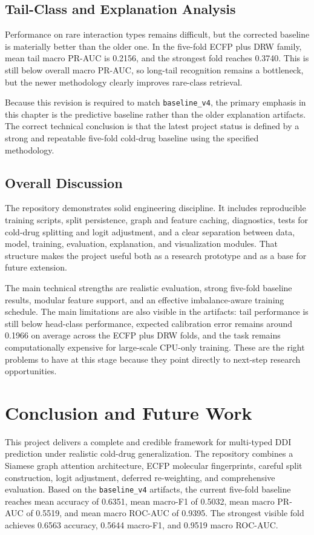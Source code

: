 \documentclass[12pt,a4paper]{report}
\begin{document}
\section*{Tail-Class and Explanation Analysis}
Performance on rare interaction types remains difficult, but the corrected baseline is materially better than the older one. In the five-fold ECFP plus DRW family, mean tail macro PR-AUC is 0.2156, and the strongest fold reaches 0.3740. This is still below overall macro PR-AUC, so long-tail recognition remains a bottleneck, but the newer methodology clearly improves rare-class retrieval.

Because this revision is required to match \texttt{baseline\_v4}, the primary emphasis in this chapter is the predictive baseline rather than the older explanation artifacts. The correct technical conclusion is that the latest project status is defined by a strong and repeatable five-fold cold-drug baseline using the specified methodology.

\section*{Overall Discussion}
The repository demonstrates solid engineering discipline. It includes reproducible training scripts, split persistence, graph and feature caching, diagnostics, tests for cold-drug splitting and logit adjustment, and a clear separation between data, model, training, evaluation, explanation, and visualization modules. That structure makes the project useful both as a research prototype and as a base for future extension.

The main technical strengths are realistic evaluation, strong five-fold baseline results, modular feature support, and an effective imbalance-aware training schedule. The main limitations are also visible in the artifacts: tail performance is still below head-class performance, expected calibration error remains around 0.1966 on average across the ECFP plus DRW folds, and the task remains computationally expensive for large-scale CPU-only training. These are the right problems to have at this stage because they point directly to next-step research opportunities.

\chapter{Conclusion and Future Work}
This project delivers a complete and credible framework for multi-typed DDI prediction under realistic cold-drug generalization. The repository combines a Siamese graph attention architecture, ECFP molecular fingerprints, careful split construction, logit adjustment, deferred re-weighting, and comprehensive evaluation. Based on the \texttt{baseline\_v4} artifacts, the current five-fold baseline reaches mean accuracy of 0.6351, mean macro-F1 of 0.5032, mean macro PR-AUC of 0.5519, and mean macro ROC-AUC of 0.9395. The strongest visible fold achieves 0.6563 accuracy, 0.5644 macro-F1, and 0.9519 macro ROC-AUC.
\end{document}
